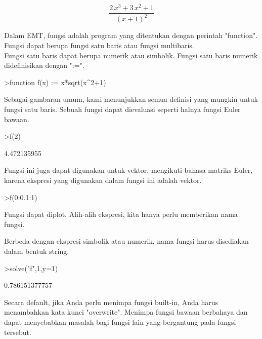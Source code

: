 \documentclass[a4paper,10pt]{article}
\begin{document}
\begin{eulernotebook}
\begin{eulerformula}
\[
\frac{2\,x^3+3\,x^2+1}{\left(x+1\right)^2}
\]
\end{eulerformula}
\begin{eulercomment}
Dalam EMT, fungsi adalah program yang ditentukan dengan perintah
"function". Fungsi dapat berupa fungsi satu baris atau fungsi
multibaris.\\
Fungsi satu baris dapat berupa numerik atau simbolik. Fungsi satu
baris numerik didefinisikan dengan ":=".
\end{eulercomment}
\begin{eulerprompt}
>function f(x) := x*sqrt(x^2+1)
\end{eulerprompt}
\begin{eulercomment}
Sebagai gambaran umum, kami menunjukkan semua definisi yang mungkin
untuk fungsi satu baris. Sebuah fungsi dapat dievaluasi seperti halnya
fungsi Euler bawaan.
\end{eulercomment}
\begin{eulerprompt}
>f(2)
\end{eulerprompt}
\begin{euleroutput}
  4.472135955
\end{euleroutput}
\begin{eulercomment}
Fungsi ini juga dapat digunakan untuk vektor, mengikuti bahasa matriks
Euler, karena ekspresi yang digunakan dalam fungsi ini adalah vektor.
\end{eulercomment}
\begin{eulerprompt}
>f(0:0.1:1)
\end{eulerprompt}
\begin{euleroutput}
  [0,  0.100499,  0.203961,  0.313209,  0.430813,  0.559017,  0.699714,
  0.854459,  1.0245,  1.21083,  1.41421]
\end{euleroutput}
\begin{eulercomment}
Fungsi dapat diplot. Alih-alih ekspresi, kita hanya perlu memberikan
nama fungsi.

Berbeda dengan ekspresi simbolik atau numerik, nama fungsi harus
disediakan dalam bentuk string.
\end{eulercomment}
\begin{eulerprompt}
>solve("f",1,y=1)
\end{eulerprompt}
\begin{euleroutput}
  0.786151377757
\end{euleroutput}
\begin{eulercomment}
Secara default, jika Anda perlu menimpa fungsi built-in, Anda harus
menambahkan kata kunci "overwrite". Menimpa fungsi bawaan berbahaya
dan dapat menyebabkan masalah bagi fungsi lain yang bergantung pada
fungsi tersebut.


\end{eulercomment}
\end{eulernotebook}
\end{document}
